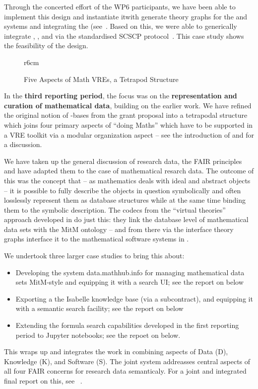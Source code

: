 Through the concerted effort of the WP6 participants, we have been able to implement this design and instantiate itwith generate theory graphs for the \GAP and \Sage systems and integrating the \LMFDB (see~\cite{ODK-D6.5}.
Based on this, we were able to generically integrate \GAP, \Sage, and \LMFDB via the standardised SCSCP protocol~\cite{HorRoz:ossp09}. This case study shows the feasibility of the design. 

\begin{wrapfigure}r{6cm}\vspace*{-1em}
\vspace*{.5em}
\caption{Five Aspects of Math VREs, a Tetrapod Structure}\label{fig:tetrapod}\vspace*{-1.5em}
\end{wrapfigure}
In the \textbf{third reporting period}, the focus was on the \textbf{representation and curation of mathematical data}, building on the earlier work. We have refined the original notion of \DKS-bases from the grant proposal into a tetrapodal structure which joins four primary aspects of ``doing Maths'' which have to be supported in a VRE toolkit via a modular organization aspect -- see the introduction  of \cite{ODK-D6.10} and \cite{CarFarKohRab:bmobb19} for a discussion.

We have taken up the general discussion of research data, the FAIR principles and have adapted them to the case of mathematical resarch data. The outcome of this was the concept that -- as mathematics deals with ideal and abstract objects -- it is possible to fully describe the objects in question symbolically and often losslessly represent them as database structures while at the same time binding them to the symbolic description. The codecs from the ``virtual theories'' approach developed in  do just this: they link the database level of mathematical data sets with the MitM ontology -- and from there via the interface theory graphs interface it to the mathematical software systems in \pn.

We undertook three larger case studies to bring this about:
\begin{itemize}
\item Developing the system data.mathhub.info for managing mathematical data sets MitM-style and equipping it with a search UI; see the report on  below
\item Exporting a the Isabelle knowledge base (via a subcontract), and equipping it with a semantic search facility;  see the report on  below 
\item Extending the formula search capabilities developed in the first reporting period to Jupyter notebooks; see the repoet on
  below.
\end{itemize}
This wraps up and integrates the work in  combining aspects of Data (D), Knowledge (K), and Software (S). The joint system addreasses central aspects of all four FAIR concerns for research data semanticaly. 
For a joint and integrated final report on this, see ~\cite{ODK-D6.10}.


